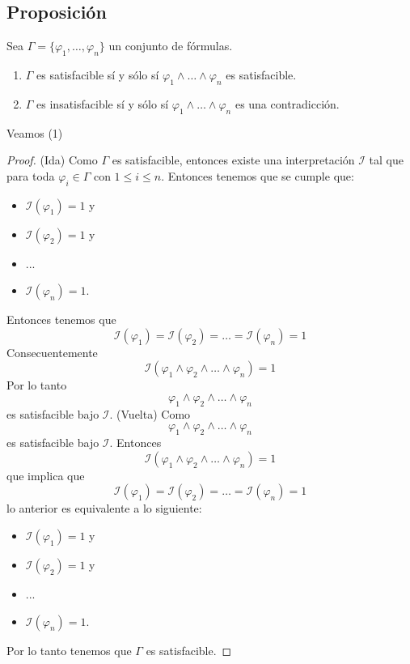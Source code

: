 \documentclass[a4paper]{article}
\begin{document}
\subsection{Proposición}
Sea $\Gamma=\{\varphi_1,\ldots,\varphi_n\}$ un conjunto de fórmulas. 
\begin{enumerate}
    \item $\Gamma$ es satisfacible sí y sólo sí $\varphi_1\land\ldots\land\varphi_n$ es
    satisfacible.
    \item $\Gamma$ es insatisfacible sí y sólo sí $\varphi_1\land\ldots\land\varphi_n$ es
    una contradicción.
\end{enumerate}
Veamos (1)
\newline 
\begin{proof}
    (Ida)
    \newline
    Como \(\Gamma\) es satisfacible, entonces existe una interpretación \(\mathcal{I}\)
    tal que para toda \(\varphi_{i} \in \Gamma\) con \(1 \leq i \leq n\). Entonces tenemos que 
    se cumple que:
    \begin{itemize}
       \item \(\mathcal{I}\left(\varphi_{1}\right) = 1\) y
       \item \(\mathcal{I}\left(\varphi_{2}\right) = 1\) y
       \item ...
       \item \(\mathcal{I}\left(\varphi_{n}\right) = 1\).
    \end{itemize}
    Entonces tenemos que 
    \[
        \mathcal{I}\left(\varphi_{1}\right) = \mathcal{I}\left(\varphi_{2}\right) = \dotsc = \mathcal{I}\left(\varphi_{n}\right) = 1
    \]
    Consecuentemente
    \[  
        \mathcal{I}\left(\varphi_{1} \land \varphi_{2} \land \dotsc \land \varphi_{n}\right) = 1  
    \]
    Por lo tanto 
    \[
        \varphi_{1} \land \varphi_{2} \land \dotsc \land \varphi_{n}  
    \]
    es satisfacible bajo \(\mathcal{I}\).
    \newline
    (Vuelta)
    \newline
    Como
    \[
        \varphi_{1} \land \varphi_{2} \land \dotsc \land \varphi_{n}  
    \]
    es satisfacible bajo \(\mathcal{I}\). Entonces
    \[  
        \mathcal{I}\left(\varphi_{1} \land \varphi_{2} \land \dotsc \land \varphi_{n}\right) = 1  
    \]
    que implica que
    \[
        \mathcal{I}\left(\varphi_{1}\right) = \mathcal{I}\left(\varphi_{2}\right) = \dotsc = \mathcal{I}\left(\varphi_{n}\right) = 1
    \]
    lo anterior es equivalente a lo siguiente:
    \begin{itemize}
        \item \(\mathcal{I}\left(\varphi_{1}\right) = 1\) y
        \item \(\mathcal{I}\left(\varphi_{2}\right) = 1\) y
        \item ...
        \item \(\mathcal{I}\left(\varphi_{n}\right) = 1\).
     \end{itemize}
    Por lo tanto tenemos que \(\Gamma\) es satisfacible.
\end{proof}
\end{document}
